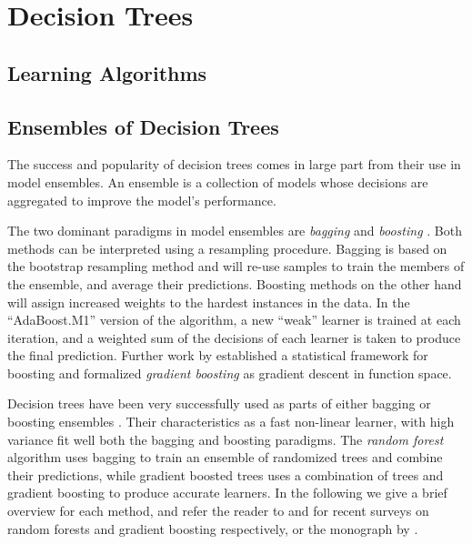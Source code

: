 \chapter{Decision Trees}
\label{ch:bg-decision-trees}

\section{Learning Algorithms}
\label{sec:bg-dt-learning-algorithms}

\section{Ensembles of Decision Trees}
\label{sec:bg-dt-ensembles}

The success and popularity of decision trees comes in large part
from their use in model ensembles. An ensemble is a collection
of models whose decisions are aggregated to improve the model's
performance.

The two dominant paradigms in model ensembles are \emph{bagging} \cite{bagging} and
\emph{boosting} \cite{boosting-schapire, boosting-freund-schapire}. Both
methods can be interpreted using a resampling procedure. Bagging is
based on the bootstrap \cite{bootstrap} resampling method and will re-use samples
to train the members of the ensemble, and average their predictions.
Boosting methods on the other hand will assign increased weights to the
hardest instances in the data. In the ``AdaBoost.M1'' version of the algorithm,
a new ``weak'' learner is trained at each iteration, and a weighted sum of
the decisions of each learner is taken to produce the final prediction.
Further work by \citet{gradient-boosting-breiman} established a statistical framework
for boosting and formalized \emph{gradient boosting} as gradient descent in function
space.

Decision trees have been very successfully used as parts of either bagging
or boosting ensembles \cite{hundreds-classifiers}. Their characteristics as a fast non-linear learner,
with high variance fit well both the bagging and boosting paradigms.
The \emph{random forest} algorithm uses bagging to train an ensemble
of randomized trees and combine their predictions, while gradient boosted trees
uses a combination of trees and gradient boosting to produce
accurate learners. In the following we give a brief overview for each method,
and refer the reader to \cite{random-forest-survey} and \cite{biau-optimization} for recent surveys on
random forests and gradient boosting respectively, or the monograph by \citet{esl}.

